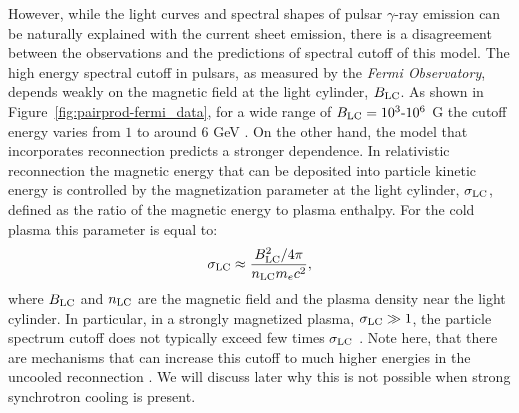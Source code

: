 However, while the light curves and spectral shapes of pulsar $\gamma$-ray emission can be naturally explained with the current sheet emission, there is a disagreement between the observations and the predictions of spectral cutoff of this model. The high energy spectral cutoff in pulsars, as measured by the {\it Fermi Observatory}, depends weakly on the magnetic field at the light cylinder, $B_{\rm LC}$. As shown in Figure~\ref{fig:pairprod-fermi_data}, for a wide range of $B_{\rm LC}=10^3\text{-}10^6$ G the cutoff energy varies from $1$ to around $6$ GeV \citep{2013ApJS..208...17A}. On the other hand, the model that incorporates reconnection predicts a stronger dependence. In relativistic reconnection the magnetic energy that can be deposited into particle kinetic energy is controlled by the magnetization parameter at the light cylinder, $\sigma_{\rm LC}$, defined as the ratio of the magnetic energy to plasma enthalpy. For the cold plasma this parameter is equal to:
\begin{equation}\label{eq:sigma_def}
    \sigma_{\rm LC}\approx \frac{B_{\rm LC}^2/4\pi}{n_{\rm LC}m_e c^2},
\end{equation}
where $B_{\rm LC}$ and $n_{\rm LC}$ are the magnetic field and the plasma density near the light cylinder. In particular, in a strongly magnetized plasma, $\sigma_{\rm LC}\gg 1$, the particle spectrum cutoff does not typically exceed few times $\sigma_{\rm LC}$ \citep{2014ApJ...783L..21S, 2016ApJ...816L...8W}. Note here, that there are mechanisms that can increase this cutoff to much higher energies in the uncooled reconnection \citep{2018arXiv180800966P}. We will discuss later why this is not possible when strong synchrotron cooling is present.

